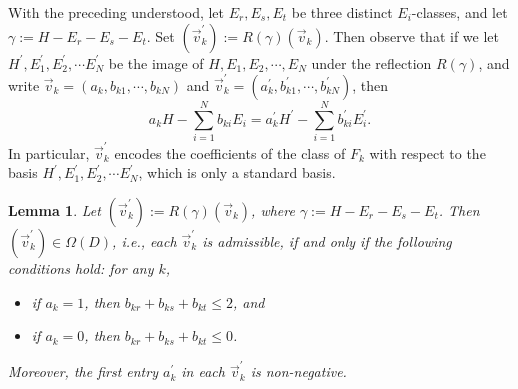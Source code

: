 \documentclass[11pt]{amsart}
\theoremstyle{plain}
\numberwithin{theorem}{section}
\newtheorem{lemma}[theorem]{Lemma}
\theoremstyle{definition}
\begin{document}
With the preceding understood, let $E_r, E_s,E_t$ be three distinct $E_i$-classes, and let 
$\gamma:=H-E_r-E_s-E_t$. Set $(\vec{v}_k^\prime):=R(\gamma)(\vec{v}_k)$. 
Then observe that if we let $H^\prime, E_1^\prime,E_2^\prime,\cdots E_N^\prime$
be the image of $H,E_1,E_2,\cdots,E_N$ under the reflection $R(\gamma)$, and write
$\vec{v}_k=(a_k, b_{k1},\cdots,b_{kN})$ and $\vec{v}_k^\prime=(a_k^\prime, b_{k1}^\prime,\cdots,b_{kN}^\prime)$, then 
$$
a_kH-\sum_{i=1}^N b_{ki} E_i=a_k^\prime H^\prime-\sum_{i=1}^N b_{ki}^\prime E_i^\prime.
$$
In particular, $\vec{v}_k^\prime$ encodes the coefficients of the class of $F_k$ with respect to the basis $H^\prime, E_1^\prime,E_2^\prime,\cdots E_N^\prime$, which is only a standard basis.

\begin{lemma}
Let $(\vec{v}_k^\prime):=R(\gamma)(\vec{v}_k)$, where $\gamma:=H-E_r-E_s-E_t$. 
Then $(\vec{v}_k^\prime)\in\Omega(D)$, i.e., each 
$\vec{v}_k^\prime$ is admissible, if and only if the following conditions hold: for any $k$,
\begin{itemize}
\item [{(i)}] if $a_k=1$, then $b_{kr}+b_{ks}+b_{kt}\leq 2$, and 
\item [{(ii)}] if $a_k=0$, then $b_{kr}+b_{ks}+b_{kt}\leq 0$. 
\end{itemize}
Moreover, the first entry $a_k^\prime$ in each $\vec{v}_k^\prime$ is non-negative. 
\end{lemma}
\end{document}
